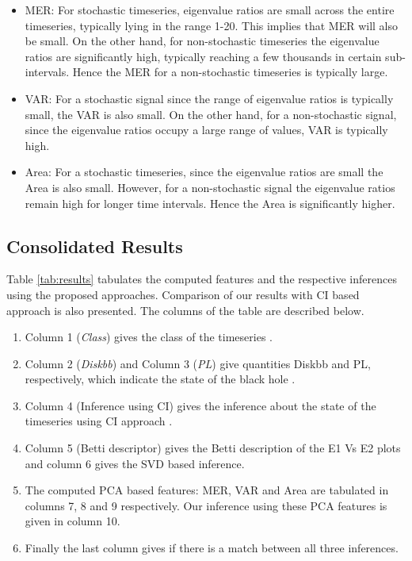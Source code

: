 \documentclass[10pt,conference]{IEEEtran}
\begin{document}
\begin{itemize}
  \item MER: For stochastic timeseries, eigenvalue ratios  are small across the entire timeseries, typically lying in the range 1-20. This implies that MER  will also be small. On the other hand, for  non-stochastic timeseries the eigenvalue ratios are significantly high, typically reaching a few thousands in certain sub-intervals. Hence the MER for a non-stochastic timeseries is typically large.
  \item VAR: For a stochastic signal since the range of eigenvalue ratios is typically small, the VAR is also small. On the other hand, for a non-stochastic signal, since the eigenvalue ratios occupy a large range of values, VAR is typically high.
  \item Area: For a stochastic timeseries, since the eigenvalue ratios  are small the Area is also small. However, for a non-stochastic signal the eigenvalue ratios remain high for longer time intervals. Hence the Area is significantly higher.
\end{itemize}

\subsection{Consolidated Results}

Table \ref{tab:results}  tabulates the computed features and the respective inferences using the proposed approaches. Comparison of our results with CI based approach \cite{Adegoke2018} is also presented. The columns of the table are described below.

\begin{enumerate}
  \item Column 1 (\textit{Class}) gives the class of the timeseries \cite{Adegoke2018}.
  \item Column 2 (\textit{Diskbb}) and Column 3 (\textit{PL}) give quantities Diskbb and  PL, respectively, which indicate the state of the black hole \cite{Adegoke2018}.
  \item Column 4 (Inference using CI) gives the inference about the state of the timeseries using CI approach \cite{Adegoke2018}.
  \item Column 5 (Betti descriptor) gives the Betti description of the E1 Vs E2 plots and column 6 gives the SVD based inference.
  \item The computed PCA based features: MER, VAR and Area  are tabulated in columns 7, 8 and 9 respectively. Our inference using these PCA features is given in column 10.
  \item Finally the last column gives if there is a match between all three inferences.
\end{enumerate}
\end{document}
